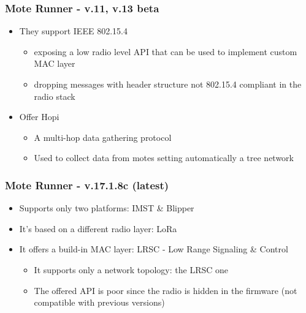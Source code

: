 \begin{frame}[fragile]
  \frametitle{Mote Runner - v.11, v.13 beta}
  \begin{itemize}
    \item They support IEEE 802.15.4
    \begin{itemize}
    	\item exposing a low radio level API that can be used to implement custom MAC layer
    	\item dropping messages with header structure not 802.15.4 compliant in the radio stack 
    \end{itemize}
    \item Offer Hopi
    \begin{itemize}
    	\item A multi-hop data gathering protocol
    	\item Used to collect data from motes setting automatically a tree network
    \end{itemize}
  \end{itemize}
\end{frame}

\begin{frame}[fragile]
  \frametitle{Mote Runner - v.17.1.8c (latest)}
  \begin{itemize}
    \item Supports only two platforms: IMST \& Blipper
    \item It’s based on a different radio layer: LoRa\texttrademark
    \item It offers a build-in MAC layer: LRSC - Low Range Signaling \& Control
    \begin{itemize}
    	\item It supports only a network topology: the LRSC one
    	\item The offered API is poor since the radio is hidden in the firmware (not compatible with previous versions)
    \end{itemize}

  \end{itemize}
\end{frame}

